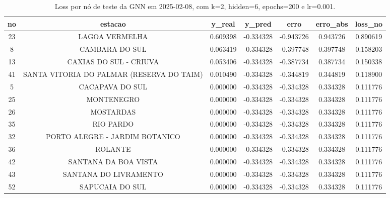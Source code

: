 \begin{table}[h]
\centering
\caption{Loss por nó de teste da GNN em 2025-02-08, com k=2, hidden=6, epochs=200 e lr=0.001.}
\label{tab:gnn_loss_nodes_k2_hidden6}
\begin{tabular}{ccccccc}
\toprule
no & estacao & y\_real & y\_pred & erro & erro\_abs & loss\_no \\
\midrule
23 & LAGOA VERMELHA & 0.609398 & -0.334328 & -0.943726 & 0.943726 & 0.890619 \\
8 & CAMBARA DO SUL & 0.063419 & -0.334328 & -0.397748 & 0.397748 & 0.158203 \\
13 & CAXIAS DO SUL - CRIUVA & 0.053406 & -0.334328 & -0.387734 & 0.387734 & 0.150338 \\
41 & SANTA VITORIA DO PALMAR (RESERVA DO TAIM) & 0.010490 & -0.334328 & -0.344819 & 0.344819 & 0.118900 \\
5 & CACAPAVA DO SUL & 0.000000 & -0.334328 & -0.334328 & 0.334328 & 0.111776 \\
25 & MONTENEGRO & 0.000000 & -0.334328 & -0.334328 & 0.334328 & 0.111776 \\
26 & MOSTARDAS & 0.000000 & -0.334328 & -0.334328 & 0.334328 & 0.111776 \\
35 & RIO PARDO & 0.000000 & -0.334328 & -0.334328 & 0.334328 & 0.111776 \\
32 & PORTO ALEGRE - JARDIM BOTANICO & 0.000000 & -0.334328 & -0.334328 & 0.334328 & 0.111776 \\
36 & ROLANTE & 0.000000 & -0.334328 & -0.334328 & 0.334328 & 0.111776 \\
42 & SANTANA DA BOA VISTA & 0.000000 & -0.334328 & -0.334328 & 0.334328 & 0.111776 \\
43 & SANTANA DO LIVRAMENTO & 0.000000 & -0.334328 & -0.334328 & 0.334328 & 0.111776 \\
52 & SAPUCAIA DO SUL & 0.000000 & -0.334328 & -0.334328 & 0.334328 & 0.111776 \\
\bottomrule
\end{tabular}
\end{table}
